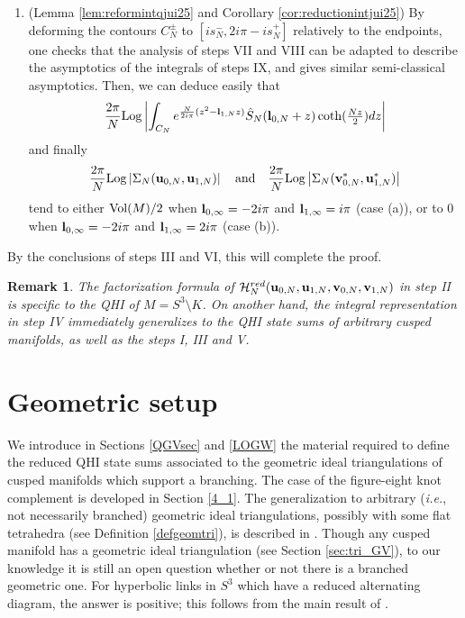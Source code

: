 \documentclass[11pt]{amsart}
\newtheorem{remark}[teo]{Remark}
\newcommand{\bu}{{\bf u}}
\newcommand{\bv}{{\bf v}}
\newcommand{\bl}{{\bf l}}
\newcommand{\Log}{{\rm Log}}
\newcommand{\Hh}{{\mathcal H}}
\begin{document}
\begin{enumerate}
\item[X)]  (Lemma \ref{lem:reformintqjui25} and Corollary \ref{cor:reductionintjui25}) By deforming the contours $C_N^\pm$ to $[is_N^-,2i\pi-is_N^+]$ relatively to the endpoints, one checks that the analysis of steps VII and VIII can be adapted to describe the asymptotics of the integrals of steps IX, and gives similar semi-classical asymptotics. Then, we can deduce easily that
$$ \dfrac{2\pi}{N}\Log \left \vert \int_{C_N} e^{\frac{N}{2i\pi}(z^2 - \bl_{1,N}z)}\hat S_N(\bl_{0,N} + z)\textstyle \coth(\frac{Nz}{2})dz \right \vert $$
and finally
$$\dfrac{2\pi}{N}\Log \left \vert \Sigma_N(\bu_{0,N},\bu_{1,N}) \right\vert \quad \mathrm{and} \quad \dfrac{2\pi}{N}\Log \left \vert \Sigma_N(\bv_{0,N}^*,\bu_{1,N}^*) \right\vert$$
tend to either ${\rm Vol}(M)/2$ when $\bl_{0,\infty} = -2i\pi$ and $\bl_{1,\infty} = i\pi$ (case (a)), or to $0$ when $\bl_{0,\infty} = -2i\pi$ and $\bl_{1,\infty} =2i\pi$ (case (b)).
\end{enumerate}
By the conclusions of steps III and VI, this will complete the proof.

\begin{remark}{\rm The factorization formula of $\Hh_{N}^{red}(\bu_{0,N},\bu_{1,N},\bv_{0,N},\bv_{1,N})$ in step II is specific to the QHI of $M=S^3\setminus K$. On another hand, the integral representation in step IV immediately generalizes to the QHI state sums of arbitrary cusped manifolds, as well as the steps I, III and V.}
\end{remark}

\section{Geometric setup}\label{NOTA} 
We introduce in Sections \ref{QGVsec} and \ref{LOGW} the material required to define the reduced QHI state sums associated to the geometric ideal triangulations of cusped manifolds which support a branching.  The case of the figure-eight knot complement is developed in Section \ref{4_1}. The generalization to arbitrary ({\it i.e.}, not necessarily branched) geometric ideal triangulations, possibly with some flat tetrahedra (see Definition \ref{defgeomtri}), is described in \cite{AGT,NA}. Though any cusped manifold has a geometric ideal triangulation (see Section \ref{sec:tri_GV}), to our knowledge it is still an open question whether or not there is a branched geometric one. For hyperbolic links in $S^3$ which have a reduced alternating diagram, the answer is positive; this follows from the main result of \cite{GMT,SakYok}. 
\smallskip
\end{document}
